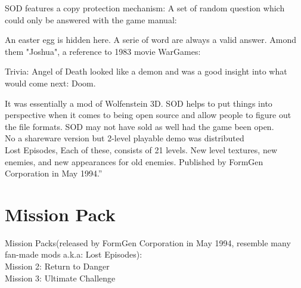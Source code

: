 \documentclass[book.tex]{subfiles}
\begin{document}
 SOD features a copy protection mechanism: A set of random question which could only be answered with the game manual:\\
    \par
\begin{figure}[H]
\centering
 \end{figure}
 \par
 An easter egg is hidden here. A serie of word are always a valid answer. Amond them "Joshua", a reference to 1983 movie WarGames:\\
    \par
\begin{figure}[H]
\centering
 \end{figure}
 \par



Trivia: Angel of Death looked like a demon and was a good insight into what would come next: Doom.




It was essentially a mod of Wolfenstein 3D. SOD helps to put things into perspective when it comes to being open source and allow people to figure out the file formats. SOD may not have sold as well had the game been open.\\
No a shareware version  but  2-level playable demo was distributed\\
Lost Episodes, Each of these, consists of 21 levels. New level textures, new enemies, and new appearances for old enemies. Published by FormGen Corporation in May 1994.''
\\
\section{Mission Pack}
Mission Packs(released by FormGen Corporation in May 1994, resemble many fan-made mods a.k.a: Lost Episodes):\\
Mission 2: Return to Danger\\
Mission 3: Ultimate Challenge\\
\end{document}

